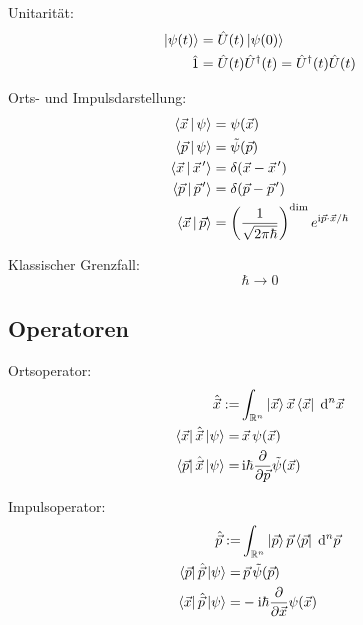 \documentclass[11pt]{article}
\numberwithin{equation}{section}
\begin{document}
			\noindent
			Unitarität:
			\begin{equation}
				\begin{aligned}
					\Ket{\psi(t)} &= \hat{U}(t) \Ket{\psi(0)} \\
					\hat{1} &= \hat{U}(t)\hat{U}^\dagger(t) = \hat{U}^\dagger(t)\hat{U}(t) \\
				\end{aligned}
			\end{equation}

			\noindent
			Orts- und Impulsdarstellung:
			\begin{equation}
				\begin{aligned}
					\Braket{\vec{x} | \psi} &= \psi(\vec{x}) \\
					\Braket{\vec{p} | \psi} &= \tilde{\psi}(\vec{p}) \\
					\Braket{\vec{x} | \pvec{x}'} &= \delta(\vec{x} - \pvec{x}') \\
					\Braket{\vec{p} | \pvec{p}'} &= \delta(\vec{p} - \pvec{p}') \\
					\Braket{\vec{x} | \vec{p}} &= \left( \frac{1}{\sqrt{2\pi\hbar}} \right)^\mathrm{dim} e^{\i \vec{p}\cdot\vec{x} / \hbar} \\
				\end{aligned}
			\end{equation}

			\noindent
			Klassischer Grenzfall:
			\begin{equation}
				\hbar \rightarrow 0
			\end{equation}

		\subsection{Operatoren}
			\noindent
			Ortsoperator:
			\begin{equation}
				\begin{aligned}
					\hat{\vec{x}} :=& \int_{\mathbb{R}^n} \Ket{\vec{x}} \vec{x} \Bra{\vec{x}}\;\mathrm{d}^n\vec{x} \\
					\Bra{\vec{x}}\hat{\vec{x}}\Ket{\psi} =& \,\vec{x}\, \psi(\vec{x}) \\
					\Bra{\vec{p}}\hat{\vec{x}}\Ket{\psi} =& \,\mathrm{i}\hbar\frac{\partial }{\partial \vec{p}}\tilde{\psi}(\vec{x}) \\
				\end{aligned}
			\end{equation}

			\noindent
			Impulsoperator:
			\begin{equation}
				\begin{aligned}
					\hat{\vec{p}} :=& \int_{\mathbb{R}^n} \Ket{\vec{p}} \vec{p} \Bra{\vec{p}}\;\mathrm{d}^n\vec{p} \\
					\Bra{\vec{p}}\hat{\vec{p}}\Ket{\psi} =& \,\vec{p}\, \tilde{\psi}(\vec{p}) \\
					\Bra{\vec{x}}\hat{\vec{p}}\Ket{\psi} =& -\mathrm{i}\hbar\frac{\partial }{\partial \vec{x}} \psi(\vec{x}) \\
				\end{aligned}
			\end{equation}
\end{document}
